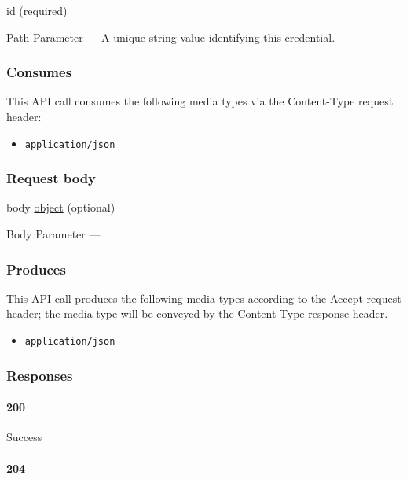 id (required)

{Path Parameter} --- A unique string value identifying this credential.

\hypertarget{consumes-9}{%
\subsubsection{Consumes}\label{consumes-9}}

This API call consumes the following media types via the {Content-Type}
request header:

\begin{itemize}
\tightlist
\item
  \texttt{application/json}
\end{itemize}

\hypertarget{request-body-9}{%
\subsubsection{Request body}\label{request-body-9}}

body \protect\hyperlink{object}{object} (optional)

{Body Parameter} ---

\hypertarget{produces-30}{%
\subsubsection{Produces}\label{produces-30}}

This API call produces the following media types according to the
{Accept} request header; the media type will be conveyed by the
{Content-Type} response header.

\begin{itemize}
\tightlist
\item
  \texttt{application/json}
\end{itemize}

\hypertarget{responses-30}{%
\subsubsection{Responses}\label{responses-30}}

\hypertarget{section-99}{%
\paragraph{200}\label{section-99}}

Success \protect\hyperlink{}{}

\hypertarget{section-100}{%
\paragraph{204}\label{section-100}}

